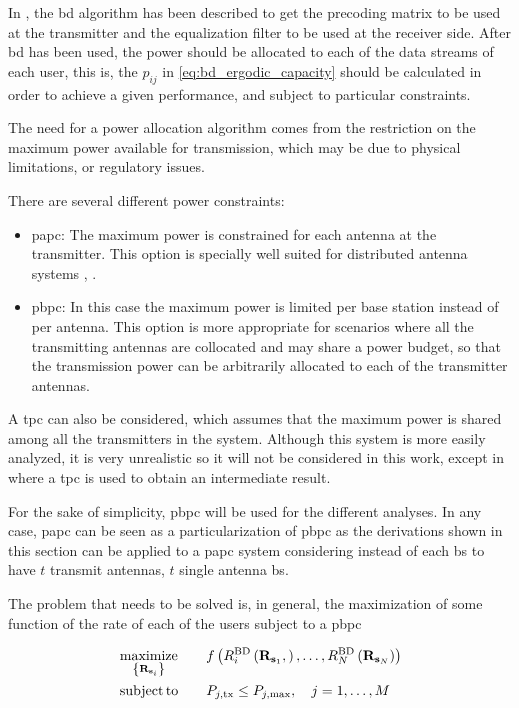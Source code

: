 In , the \gls{bd} algorithm has been described to get the precoding
matrix to be used at the transmitter and the equalization filter to be used at
the receiver side. After \gls{bd} has been used, the power should be allocated
to each of the data streams of each user, this is, the $p_{ij}$ in
\eqref{eq:bd_ergodic_capacity} should be calculated in order to achieve a given
performance, and subject to particular constraints.

The need for a power allocation algorithm comes from the restriction on the
maximum power available for transmission, which may be due to physical
limitations, or regulatory issues.

There are several different power constraints:

\begin{itemize}
    \item \gls{papc}: The maximum power is constrained for each antenna at the
        transmitter. This option is specially well suited for distributed
        antenna systems \cite{choi07}, \cite{lee12}.
    \item \gls{pbpc}: In this case the maximum power is limited per base station
        instead of per antenna. This option is more appropriate for scenarios
        where all the transmitting antennas are collocated and may share a power
        budget, so that the transmission power can be arbitrarily allocated to
        each of the transmitter antennas.
\end{itemize}

A \gls{tpc} can also be considered, which assumes that the maximum power is
shared among all the transmitters in the system. Although this system is more
easily analyzed, it is very unrealistic so it will not be considered in this
work, except in  where a \gls{tpc} is used to obtain an
intermediate result.

For the sake of simplicity, \gls{pbpc} will be used for the different analyses. In any case, \gls{papc} can be seen as a particularization of \gls{pbpc} as the
derivations shown in this section can be applied to a \gls{papc} system
considering instead of each \gls{bs} to have $t$ transmit antennas, $t$ single
antenna \gls{bs}.

The problem that needs to be solved is, in general, the maximization of some
function of the rate of each of the users subject to a \gls{pbpc}

\begin{equation} \label{eq:generic_optim_problem}
\begin{aligned}
	&\operatorname*{maximize}\limits_{\left\{\mathbf{R}_{\mathbf{s}_i}\right\}} &&\quad f\left(R_i^{\text{BD}}
    \left(\mathbf{R}_{\mathbf{s}_1},\right), \ldots, R_N^{\text{BD}}\left(\mathbf{R}_{\mathbf{s}_N}\right)
    \right) \\
	&\operatorname*{subject\,to} &&\quad P_{j, \text{tx}} \leq P_{j, \max},\quad j = 1, \ldots, M
\end{aligned}
\end{equation}

